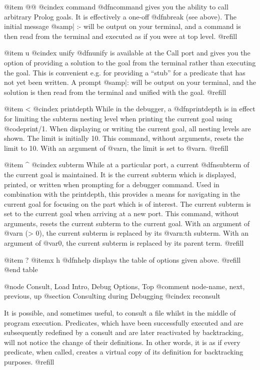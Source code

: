@item @@
@cindex command
@dfn{command} gives you the ability to call arbitrary Prolog goals.  It
is effectively a one-off @dfn{break} (see above).  The initial message
@samp{| :- } will be output on your terminal, and a command is then read
from the terminal and executed as if you were at top level. @refill

@item u
@cindex unify
@dfn{unify} is available at the Call port and gives you the option of
providing a solution to the goal from the terminal rather than executing
the goal.  This is convenient e.g. for providing a ``stub'' for a
predicate that has not yet been written.  A prompt @samp{|: } will be
output on your terminal, and the solution is then read from the terminal
and unified with the goal. @refill

@item <
@cindex printdepth
While in the debugger, a @dfn{printdepth} is in effect for limiting
the subterm nesting level when printing the current goal using @code{print/1}.
When displaying or writing the current goal, all nesting levels are shown.
The limit is initially 10.  This command, without arguments, resets the
limit to 10.  With an argument of @var{n}, the limit is set to @var{n}.
@refill

@item ^
@cindex subterm
While at a particular port, a current @dfn{subterm} of the current goal
is maintained.  It is the current subterm which is displayed, printed,
or written when prompting for a debugger command.  Used in combination
with the printdepth, this provides a means for navigating in the
current goal for focusing on the part which is of interest.
The current subterm is set to the current goal when arriving at a new port.
This command, without arguments, resets the current subterm to the current 
goal.  With an argument of @var{n} (> 0), the current subterm is replaced
by its @var{n}:th subterm.  With an argument of @var{0}, the current subterm
is replaced by its parent term.
@refill

@item ?
@itemx h
@dfn{help} displays the table of options given above. @refill
@end table

@node Consult, Load Intro, Debug Options, Top
@comment  node-name,  next,  previous,  up
@section Consulting during Debugging
@cindex reconsult

It is possible, and sometimes useful, to consult a file whilst in the
middle of program execution.  Predicates, which have been successfully
executed and are subsequently redefined by a consult and are later
reactivated by backtracking, will not notice the change of their
definitions.  In other words, it is as if every predicate, when called,
creates a virtual copy of its definition for backtracking purposes.
@refill

